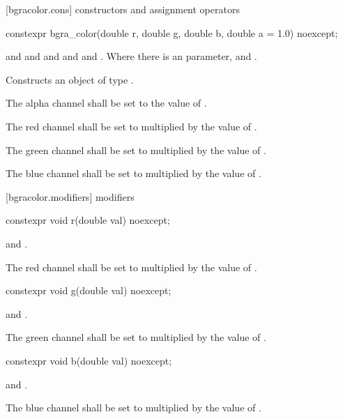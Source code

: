  [bgracolor.cons] { constructors and assignment operators}

\begin{itemdecl}
constexpr bgra_color(double r, double g, double b, double a = 1.0) noexcept;
\end{itemdecl}
\begin{itemdescr}
\pnum
\requires
{} and  and  and  and  and . Where there is an  parameter,  and .

\pnum
\effects
Constructs an object of type .

\pnum
The alpha channel shall be set to the value of .

\pnum
The red channel shall be set to  multiplied by the value of  .

\pnum
The green channel shall be set to  multiplied by the value of .

\pnum
The blue channel shall be set to  multiplied by the value of .
\end{itemdescr}

 [bgracolor.modifiers]{ modifiers}

\begin{itemdecl}
constexpr void r(double val) noexcept;
\end{itemdecl}

\begin{itemdescr}
\pnum
\requires
{} and .

\pnum
\effects
The red channel shall be set to  multiplied by the value of  .
\end{itemdescr}

\begin{itemdecl}
constexpr void g(double val) noexcept;
\end{itemdecl}
\begin{itemdescr}
\pnum
\requires
{} and .

\pnum
\effects
The green channel shall be set to  multiplied by the value of  .
\end{itemdescr}

\begin{itemdecl}
constexpr void b(double val) noexcept;
\end{itemdecl}
\begin{itemdescr}
\pnum
\requires
{} and .

\pnum
\effects
The blue channel shall be set to  multiplied by the value of  .
\end{itemdescr}


